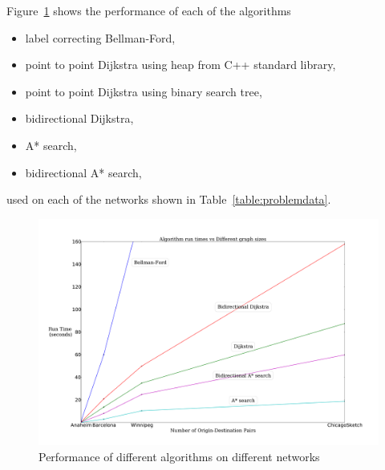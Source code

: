 Figure~\ref{fig:allresults} shows the performance of each of the algorithms
\begin{itemize}
    \item label correcting Bellman-Ford,
    \item point to point Dijkstra using heap from C++ standard library,
    \item point to point Dijkstra using binary search tree,
    \item bidirectional Dijkstra,
    \item A* search,
    \item bidirectional A* search,
\end{itemize}
used on each of the networks shown in Table~\ref{table:problemdata}.
\begin{figure}[H]
    \centering
    \includegraphics[width=\textwidth]{img/runtime}
    \caption{Performance of different algorithms on different networks}
    \label{fig:allresults}
\end{figure}

